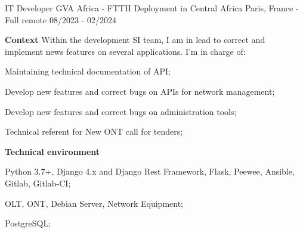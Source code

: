 \begin{cventries}
  \cventry
    {IT Developer} %
    {GVA Africa - FTTH Deployment in Central Africa} %
    {Paris, France - Full remote} %
    {08/2023 - 02/2024} %
    {
      \textbf{Context}
      \newline
      Within the development SI team, I am in lead to correct and implement news features on several applications. I'm in charge of:
      \newline \vspace{12pt}
      \begin{cvitems} %
        \item {Maintaining technical documentation of API;}
        \item {Develop new features and correct bugs on APIs for network management;}
        \item {Develop new features and correct bugs on administration tools;}
        \item {Technical referent for New ONT call for tenders;}
      \end{cvitems}
      \textbf{Technical environment}
      \newline \vspace{12pt}
      \begin{cvitems}
        \item {Python 3.7+, Django 4.x and Django Rest Framework, Flask, Peewee, Ansible, Gitlab, Gitlab-CI;}
        \item {OLT, ONT, Debian Server, Network Equipment;}
        \item {PostgreSQL;}
      \end{cvitems}
    }


\end{cventries}
